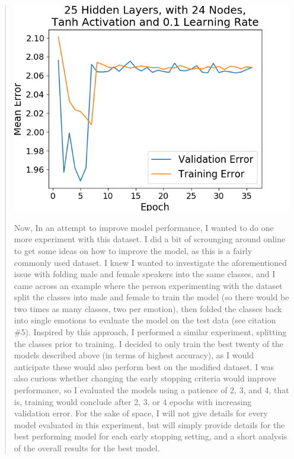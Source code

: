 \documentclass{article}
\begin{document}
\begin{quote}
\begin{center}
	\includegraphics[scale=0.5]{figs/Emotions_Multiclass_Classification_25_Hidden_Layers_with_24_Nodes_Tanh_Activation_and_0.1_Learning_Rate.png}
\end{center}


Now, In an attempt to improve model performance, I wanted to do one more experiment with this dataset. I did a bit of scrounging around online to get some ideas on how to improve the model, as this is a fairly commonly used dataset. I knew I wanted to investigate the aforementioned issue with folding male and female speakers into the same classes, and I came across an example where the person experimenting with the dataset split the classes into male and female to train the model (so there would be two times as many classes, two per emotion), then folded the classes back into single emotions to evaluate the model on the test data (see citation \#5). Inspired by this approach, I performed a similar experiment, splitting the classes prior to training. I decided to only train the best twenty of the models described above (in terms of highest accuracy), as I would anticipate these would also perform best on the modified dataset. I was also curious whether changing the early stopping criteria would improve performance, so I evaluated the models using a patience of 2, 3, and 4, that is, training would conclude after 2, 3, or 4 epochs with increasing validation error. For the sake of space, I will not give details for every model evaluated in this experiment, but will simply provide details for the best performing model for each early stopping setting, and a short analysis of the overall results for the best model.


\end{quote}
\end{document}

